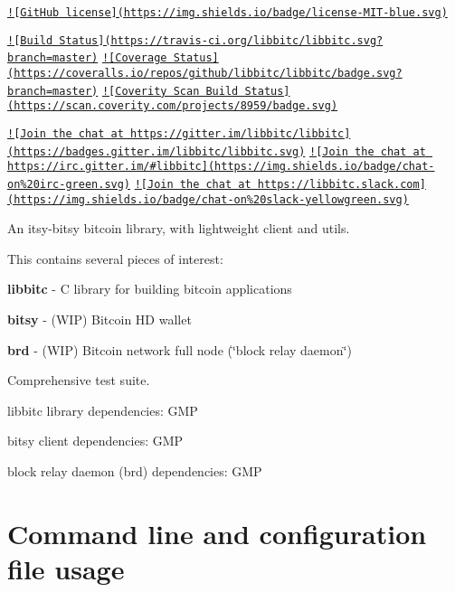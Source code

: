 \href{https://raw.githubusercontent.com/libbitc/libbitc/master/COPYING}{\tt !\mbox{[}Git\-Hub license\mbox{]}(https\-://img.\-shields.\-io/badge/license-\/\-M\-I\-T-\/blue.\-svg)}

\href{https://travis-ci.org/libbitc/libbitc}{\tt !\mbox{[}Build Status\mbox{]}(https\-://travis-\/ci.\-org/libbitc/libbitc.\-svg?branch=master)} \href{https://coveralls.io/github/libbitc/libbitc?branch=master}{\tt !\mbox{[}Coverage Status\mbox{]}(https\-://coveralls.\-io/repos/github/libbitc/libbitc/badge.\-svg?branch=master)} \href{https://scan.coverity.com/projects/libbitc-libbitc}{\tt !\mbox{[}Coverity Scan Build Status\mbox{]}(https\-://scan.\-coverity.\-com/projects/8959/badge.\-svg)}

\href{https://gitter.im/libbitc/libbitc?utm_source=badge&utm_medium=badge&utm_campaign=pr-badge&utm_content=badge}{\tt !\mbox{[}Join the chat at https\-://gitter.\-im/libbitc/libbitc\mbox{]}(https\-://badges.\-gitter.\-im/libbitc/libbitc.\-svg)} \href{https://irc.gitter.im/}{\tt !\mbox{[}Join the chat at https\-://irc.\-gitter.\-im/\#libbitc\mbox{]}(https\-://img.\-shields.\-io/badge/chat-\/on\%20irc-\/green.\-svg)} \href{https://libbitc.slack.com}{\tt !\mbox{[}Join the chat at https\-://libbitc.\-slack.\-com\mbox{]}(https\-://img.\-shields.\-io/badge/chat-\/on\%20slack-\/yellowgreen.\-svg)}

An itsy-\/bitsy bitcoin library, with lightweight client and utils.

This contains several pieces of interest\-:
\begin{DoxyItemize}
\item {\bfseries libbitc} -\/ C library for building bitcoin applications
\item {\bfseries bitsy} -\/ (W\-I\-P) Bitcoin H\-D wallet
\item {\bfseries brd} -\/ (W\-I\-P) Bitcoin network full node (\char`\"{}block relay daemon\char`\"{})
\item Comprehensive test suite.
\end{DoxyItemize}

libbitc library dependencies\-: G\-M\-P

bitsy client dependencies\-: G\-M\-P

block relay daemon (brd) dependencies\-: G\-M\-P

\section*{Command line and configuration file usage }

